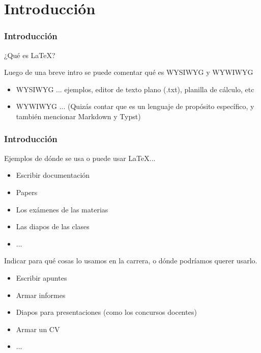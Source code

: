 \section{Introducción}\label{sec:Introducción}

\begin{frame}
\frametitle{Introducción}
    \begin{tcolorbox}[colframe=color1]
        \begin{center}
            ¿Qué es \LaTeX ?
        \end{center}
    \end{tcolorbox}
    
    Luego de una breve intro se puede comentar qué es WYSIWYG y WYWIWYG
    
    \begin{itemize}
    \item WYSIWYG ... ejemplos, editor de texto plano (.txt), planilla de cálculo, etc
    \item WYWIWYG ... (Quizás contar que es un lenguaje de propósito específico, y también mencionar Markdown y Typst)
    \end{itemize}    
\end{frame}

\begin{frame}
\frametitle{Introducción}
    Ejemplos de dónde se usa o puede usar \LaTeX ...
    \begin{itemize}
    \item Escribir documentación
    \item Papers
    \item Los exámenes de las materias
    \item Las diapos de las clases
    \item ...
    \end{itemize}
    Indicar para qué cosas lo usamos en la carrera, o dónde podríamos querer usarlo.
    \begin{itemize}
    \item Escribir apuntes
    \item Armar informes
    \item Diapos para presentaciones (como los concursos docentes)
    \item Armar un CV
    \item ...
    \end{itemize}
\end{frame}
